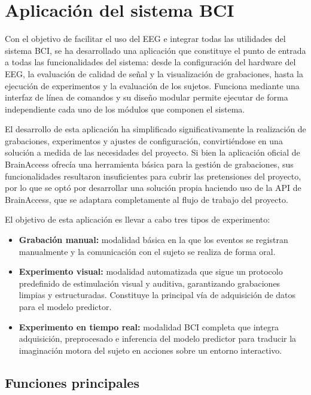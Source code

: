\section{Aplicación del sistema BCI}
\label{sec:aplicacionBCI}

Con el objetivo de facilitar el uso del EEG e integrar todas las utilidades del sistema BCI, se ha desarrollado una aplicación que constituye el punto de entrada a todas las funcionalidades del sistema: desde la configuración del hardware del EEG, la evaluación de calidad de señal y la visualización de grabaciones, hasta la ejecución de experimentos y la evaluación de los sujetos. Funciona mediante una interfaz de línea de comandos y su diseño modular permite ejecutar de forma independiente cada uno de los módulos que componen el sistema.

El desarrollo de esta aplicación ha simplificado significativamente la realización de grabaciones, experimentos y ajustes de configuración, convirtiéndose en una solución a medida de las necesidades del proyecto. Si bien la aplicación oficial de BrainAccess ofrecía una herramienta básica para la gestión de grabaciones, sus funcionalidades resultaron insuficientes para cubrir las pretensiones del proyecto, por lo que se optó por desarrollar una solución propia haciendo uso de la API de BrainAccess, que se adaptara completamente al flujo de trabajo del proyecto.

El objetivo de esta aplicación es llevar a cabo tres tipos de experimento:

\begin{itemize}
\item \textbf{Grabación manual:} modalidad básica en la que los eventos se registran manualmente y la comunicación con el sujeto se realiza de forma oral.

\item \textbf{Experimento visual:} modalidad automatizada que sigue un protocolo predefinido de estimulación visual y auditiva, garantizando grabaciones limpias y estructuradas. Constituye la principal vía de adquisición de datos para el modelo predictor.

\item \textbf{Experimento en tiempo real:} modalidad BCI completa que integra adquisición, preprocesado e inferencia del modelo predictor para traducir la imaginación motora del sujeto en acciones sobre un entorno interactivo.\end{itemize}
\subsection{Funciones principales}
\label{subsec:funcionesPrincipales}

